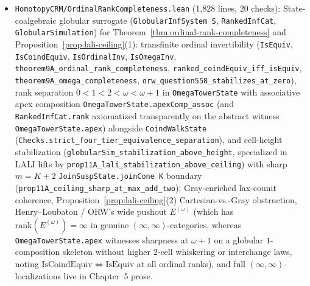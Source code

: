 \documentclass[10pt,twoside,openright]{book}
\theoremstyle{crmplain}
\theoremstyle{crmdef}
\theoremstyle{crmremark}
\begin{document}
\begin{itemize}[leftmargin=1.5em]
  \item \texttt{HomotopyCRM/\allowbreak Ordinal\allowbreak Rank\allowbreak Completeness.lean} (1,828 lines, 20 checks): State-coalgebraic globular surrogate (\texttt{GlobularInfSystem S}, \texttt{RankedInfCat}, \texttt{GlobularSimulation}) for Theorem~\ref{thm:ordinal-rank-completeness} and Proposition~\ref{prop:lali-ceiling}(1): transfinite ordinal invertibility (\texttt{IsEquiv}, \texttt{IsCoindEquiv}, \texttt{IsOrdinalInv}, \texttt{IsOmegaInv}, \texttt{theorem9A\_\allowbreak ordinal\_\allowbreak rank\_\allowbreak completeness}, \texttt{ranked\_\allowbreak coindEquiv\_\allowbreak iff\_\allowbreak isEquiv}, \texttt{theorem9A\_\allowbreak omega\_\allowbreak completeness}, \texttt{orw\_\allowbreak question558\_\allowbreak stabilizes\_\allowbreak at\_\allowbreak zero}), rank separation $0 < 1 < 2 < \omega < \omega + 1$ in \texttt{OmegaTowerState} with associative apex composition \texttt{OmegaTowerState.apexComp\_\allowbreak assoc} (and \texttt{RankedInfCat.rank} axiomatized transparently on the abstract witness \texttt{OmegaTowerState.apex}) alongside \texttt{CoindWalkState} (\texttt{Checks.\allowbreak strict\_\allowbreak four\_\allowbreak tier\_\allowbreak equivalence\_\allowbreak separation}), and cell-height stabilization (\texttt{globularSim\_\allowbreak stabilization\_\allowbreak above\_\allowbreak height}, specialized in LALI lifts by \texttt{prop11A\_\allowbreak lali\_\allowbreak stabilization\_\allowbreak above\_\allowbreak ceiling}) with sharp $m = K + 2$ \texttt{JoinSuspState.\allowbreak joinCone K} boundary (\texttt{prop11A\_\allowbreak ceiling\_\allowbreak sharp\_\allowbreak at\_\allowbreak max\_\allowbreak add\_\allowbreak two}); Gray-enriched lax-counit coherence, Proposition~\ref{prop:lali-ceiling}(2) Cartesian-vs.-Gray obstruction, Henry--Loubaton / ORW's wide pushout $E^{(\omega)}$ (which has $\mathrm{rank}(E^{(\omega)}) = \infty$ in genuine $(\infty,\infty)$-categories, whereas \texttt{OmegaTowerState.apex} witnesses sharpness at $\omega + 1$ on a globular $1$-composition skeleton without higher $2$-cell whiskering or interchange laws, noting $\mathrm{IsCoindEquiv} \iff \mathrm{IsEquiv}$ at all ordinal ranks), and full $(\infty,\infty)$-localizations live in Chapter~5 prose.

\end{itemize}
\end{document}
